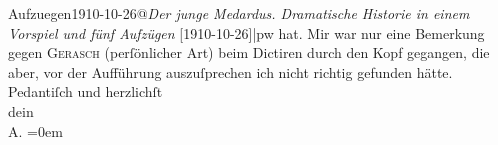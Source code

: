 \begin{ledgroupsized}[t]{13cm}
{{                  Aufzuegen1910-10-26@\strich\emph{Der junge Medardus. Dramatische Historie in einem Vorspiel und fünf Aufzügen} {[}1910-10-26{]}|pw}} hat. Mir war nur eine Bemerkung gegen \textsc{Gerasch} (perſönlicher Art) beim Dictiren durch den Kopf gegangen, die aber, vor der
               Aufführung auszuſprechen ich nicht richtig gefunden hätte.\pend
           \pstart
           Pedantiſch und herzlichſt{\\[\baselineskip]}dein{\\[\baselineskip]}\spacefill\mbox{A.}\pend
           \leftskip=0em{}
         
         \endnumbering{}\end{ledgroupsized}  \newcommand{\dateiname}{L01982}\newcommand{\titel}{Arthur Schnitzler an Hermann Bahr, 19. 11. 1910}\newcommand{\editorInnen}{ Kurt Ifkovits,  Martin Anton Müller}
      